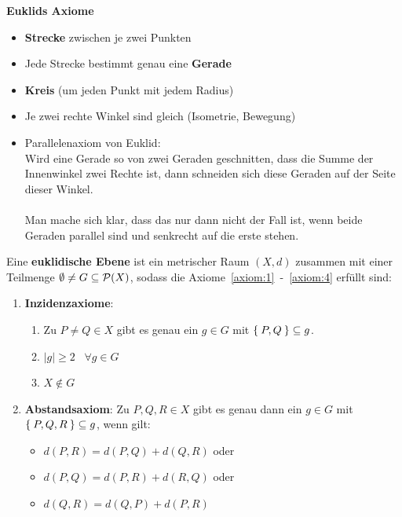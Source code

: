 \textbf{Euklids Axiome}
\begin{itemize}
    \item \textbf{Strecke} zwischen je zwei Punkten
    \item Jede Strecke bestimmt genau eine \textbf{Gerade}
    \item \textbf{Kreis} (um jeden Punkt mit jedem Radius)
    \item Je zwei rechte Winkel sind gleich (Isometrie, Bewegung)
    \item Parallelenaxiom von Euklid:\\
        Wird eine Gerade so von zwei Geraden geschnitten, dass die 
        Summe der Innenwinkel zwei Rechte ist, dann schneiden sich
        diese Geraden auf der Seite dieser Winkel.\\
        \\
        Man mache sich klar, dass das nur dann nicht der Fall ist, 
        wenn beide Geraden parallel sind und senkrecht auf die erste stehen.
\end{itemize}

\begin{definition}%
    Eine \textbf{euklidische Ebene} ist ein metrischer Raum $(X,d)$ 
    zusammen mit einer Teilmenge $\emptyset \neq G \subseteq \mathcal{P}(X)$, sodass die
    Axiome~\ref{axiom:1}~-~\ref{axiom:4} erfüllt sind:
    \begin{enumerate}[label=§\arabic*),ref=§\arabic*]
        \item \textbf{Inzidenzaxiome}:\label{axiom:1}
            \begin{enumerate}[label=(\roman*),ref=\theenumi{} (\roman*)]
                \item \label{axiom:1.1} Zu $P \neq Q \in X$ gibt es genau ein $g \in G$ mit
                      $\Set{P, Q} \subseteq g$.
                \item \label{axiom:1.2} $|g| \geq 2 \;\;\; \forall g \in G$
                \item \label{axiom:1.3} $X \notin G$
            \end{enumerate}
        \item \textbf{Abstandsaxiom}: Zu $P, Q, R \in X$ gibt es \label{axiom:2}
              genau dann ein $g \in G$ mit $\Set{P, Q, R} \subseteq g$,
              wenn gilt: 
              \begin{itemize}[]
                \item $d(P, R) = d(P, Q) + d(Q, R)$ oder
                \item $d(P, Q) = d(P, R) + d(R, Q)$ oder
                \item $d(Q, R) = d(Q, P) + d(P, R)$
              \end{itemize}
    \end{enumerate}
\end{definition}

